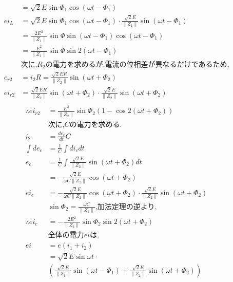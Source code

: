 \documentclass[twocolumn]{article}
\begin{document}
\begin{enumerate}
\begin{align*}
              &= \sqrt{2}E\sin \Phi_1 \cos \left( \omega t - \Phi_1 \right)\\
          ei_L  &= \sqrt{2}E\sin \Phi_1 \cos \left( \omega t - \Phi_1 \right) \cdot \frac{\sqrt{2}E}{\|Z_1\|} \sin \left(\omega t - \Phi_1\right)\\
                &= \frac{2E^2}{\|Z_1\|}\sin\Phi \sin \left( \omega t - \Phi_1\right)\cos \left( \omega t - \Phi_1\right)\\
                &= \frac{E^2}{\|Z_1\|}\sin\Phi \sin2\left( \omega t - \Phi_1\right)\\
          &\text{次に,}R_2\text{の電力を求めるが,電流の位相差が異なるだけであるため,}\\
          e_{r2} &= i_2R = \frac{\sqrt{2}ER}{\|Z_2\|}\sin\left(\omega t + \Phi_2\right)\\
          ei_{r2} &= \frac{\sqrt{2}ER}{\|Z_2\|}\sin\left(\omega t + \Phi_2\right) \cdot \frac{\sqrt{2}E}{\|Z_2\|} \sin \left(\omega t + \Phi_2\right)\\          
\end{align*}
\begin{align*}
  \therefore ei_{r2} &= \frac{E^2}{\|Z_2\|}\sin\Phi_2 \left(1 - \cos 2 \left(\omega t + \Phi_2\right)\right)\\
          &\text{次に,}C\text{の電力を求める.}\\
          i_2 &= \frac{de_c}{dt}C\\
          \int de_c &= \frac{1}{C} \int di_c dt\\
          e_c   &= \frac{1}{C} \int \frac{\sqrt{2}E}{\|Z_2\|}\sin \left( \omega t + \Phi_2\right) dt\\
                &= -\frac{\sqrt{2}E}{\omega C\|Z_2\|} \cos \left( \omega t + \Phi_2\right)\\
          ei_c  &= -\frac{\sqrt{2}E}{\omega C\|Z_2\|} \cos \left( \omega t + \Phi_2\right) \cdot \frac{\sqrt{2}E}{\|Z_2\|}\sin \left( \omega t + \Phi_2\right)\\
          &\sin \Phi_2 = \frac{\omega C}{\|Z_2\|}\text{,加法定理の逆より,}\\
\therefore ei_c &= -\frac{2E^2}{\|Z_2\|}\sin \Phi_2 \sin 2\left(\omega t + \Phi_2\right)\\
          &\text{全体の電力}ei\text{は,}\\
          ei  &= e\left(i_1 + i_2\right)\\
              &= \sqrt{2}E\sin\omega t \cdot \\
              & \left(\frac{\sqrt{2}E}{\|Z_1\|}\sin\left(\omega t - \Phi_1\right) +  \frac{\sqrt{2}E}{\|Z_2\|}\sin\left(\omega t + \Phi_2\right)\right)\\

\end{align*}
\end{enumerate}
\end{document}
